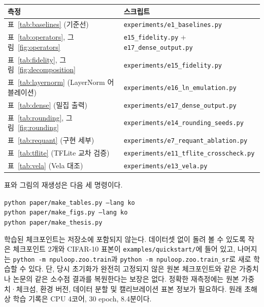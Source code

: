 \documentclass[11pt,a4paper,oneside]{report}
\begin{document}
\begin{center}
\small
\begin{tabular}{ll}
\toprule
측정 & 스크립트 \\
\midrule
표~\ref{tab:baselines} (기준선) & \texttt{experiments/e1\_baselines.py} \\
표~\ref{tab:operators}, 그림~\ref{fig:operators} & \texttt{e15\_fidelity.py} + \texttt{e17\_dense\_output.py} \\
표~\ref{tab:fidelity}, 그림~\ref{fig:decomposition} & \texttt{experiments/e15\_fidelity.py} \\
표~\ref{tab:layernorm} (LayerNorm 어블레이션) & \texttt{experiments/e16\_ln\_emulation.py} \\
표~\ref{tab:dense} (밀집 출력) & \texttt{experiments/e17\_dense\_output.py} \\
표~\ref{tab:rounding}, 그림~\ref{fig:rounding} & \texttt{experiments/e14\_rounding\_seeds.py} \\
표~\ref{tab:requant} (구현 세부) & \texttt{experiments/e7\_requant\_ablation.py} \\
표~\ref{tab:tflite} (TFLite 교차 검증) & \texttt{experiments/e11\_tflite\_crosscheck.py} \\
표~\ref{tab:vela} (Vela 대조) & \texttt{experiments/e13\_vela.py} \\
\bottomrule
\end{tabular}
\end{center}

\medskip
\noindent 표와 그림의 재생성은 다음 세 명령이다.

\begin{center}
\small
\texttt{python paper/make\_tables.py --lang ko}\\
\texttt{python paper/make\_figs.py --lang ko}\\
\texttt{python paper/make\_thesis.py}
\end{center}

\medskip
\noindent 학습된 체크포인트는 저장소에 포함되지 않는다. 데이터셋 없이 돌려 볼 수 있도록 작은 체크포인트
2개와 CIFAR-10 표본이 \texttt{examples/quickstart/}에 들어 있고, 나머지는
\texttt{python -m npuloop.zoo.train}과 \texttt{python -m npuloop.zoo.train\_sr}로
새로 학습할 수 있다. 단, 당시 초기화가 완전히 고정되지 않은 원본 체크포인트와 같은 가중치나
논문의 같은 소수점 결과를 복원한다는 보장은 없다. 정확한 재측정에는 원본 가중치·체크섬,
환경 버전, 데이터 분할 및 캘리브레이션 표본 정보가 필요하다. 원래 초해상 학습 기록은 CPU
4코어, 30 epoch, 8.4분이다.
\end{document}
